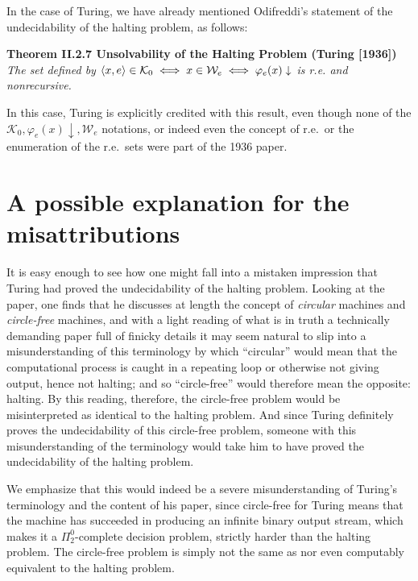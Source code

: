 \documentclass{amsart}
\begin{document}
In the case of Turing, we have already mentioned Odifreddi's \cite[p. 150]{odifreddi1992classical} statement of the undecidability of the halting problem, as follows: 

\bigskip 

\noindent\textbf{Theorem II.2.7 Unsolvability of the Halting Problem (Turing [1936])} \textit{The set defined by $\braket{x,e} \in \mathcal{K}_0 \iff x \in \mathcal{W}_e \iff \varphi_e(x)\downarrow$ is r.e. and nonrecursive.}

\bigskip 

In this case, Turing is explicitly credited with this result, even though none of the $\mathcal{K}_0, \varphi_e(x)\downarrow,\mathcal{W}_e$ notations, or indeed even the concept of r.e.~or the enumeration of the r.e.~sets were part of the 1936 paper. 

\section{A possible explanation for the misattributions}\label{Section.Possible-explanation}

It is easy enough to see how one might fall into a mistaken impression that Turing had proved the undecidability of the halting problem. Looking at the paper, one finds that he discusses at length the concept of \emph{circular} machines and \emph{circle-free} machines, and with a light reading of what is in truth a technically demanding paper full of finicky details it may seem natural to slip into a misunderstanding of this terminology by which ``circular'' would mean that the computational process is caught in a repeating loop or otherwise not giving output, hence not halting; and so ``circle-free'' would therefore mean the opposite: halting. By this reading, therefore, the circle-free problem would be misinterpreted as identical to the halting problem. And since Turing definitely proves the undecidability of this circle-free problem, someone with this misunderstanding of the terminology would take him to have proved the undecidability of the halting problem. 

We emphasize that this would indeed be a severe misunderstanding of Turing's terminology and the content of his paper, since circle-free for Turing means that the machine has succeeded in producing an infinite binary output stream, which makes it a $\Pi^0_2$-complete decision problem, strictly harder than the halting problem. The circle-free problem is simply not the same as nor even computably equivalent to the halting problem.
\end{document}
